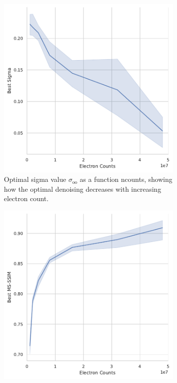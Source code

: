 \begin{figure}
    \centering
    \begin{subfigure}[t]{0.49\linewidth}
        \centering
        \includegraphics[width=\linewidth]{images/hyperparameter_sigma_averaged_10_images.pdf}
        \caption{Optimal sigma value $\sigma_{\text{oo}}$ as a function \gls{ncounts}, showing how the optimal denoising decreases with increasing electron count.}
        \label{fig:hyperparameter-sigma-averaged-10-images}
    \end{subfigure}
    \hfill
    \begin{subfigure}[t]{0.49\linewidth}
        \centering
        \includegraphics[width=\linewidth]{images/hyperparameter_msssim_averaged_10_images.pdf}

\end{subfigure}
\end{figure}
